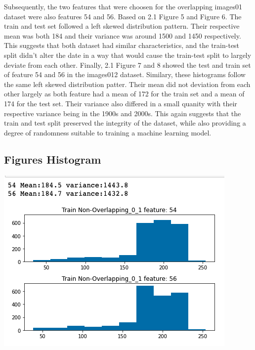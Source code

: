 \documentclass[12pt]{article}
\begin{document}
\begin{multicols*}{2}
  \hspace*{10mm} Subsequently, the two features that were choosen for the overlapping images01 dataset were also features 54 and 56. Based 
  on 2.1 Figure 5 and Figure 6. The train and test set followed a left skewed distribution pattern. Their respective mean was both 184 and their
  variance was around 1500 and 1450 respectively. This suggests that both dataset had similar characteristics, and the train-test split didn't
  alter the date in a way that would cause the train-test split to largely deviate from each other. Finally, 2.1 Figure 7 and 8 showed the test and train set of
  feature 54 and 56 in the images012 dataset. Similary, these histograms follow the same left skewed distribution patter. Their mean did not deviation from 
  each other largely as both feature had a mean of 172 for the train set and a mean of 174 for the test set. Their variance also differed in a small
  quanity with their respective variance being in the 1900s and 2000s. This again suggests that the train and test split preserved the integrity of the dataset,
  while also providing a degree of randomness suitable to training a machine learning model.

  \subsection{Figures Histogram} 
	\begin{center}
		\includegraphics[scale=0.3]{../screenshot/train_non_over_01.png}


\end{center}
\end{multicols*}
\end{document}
